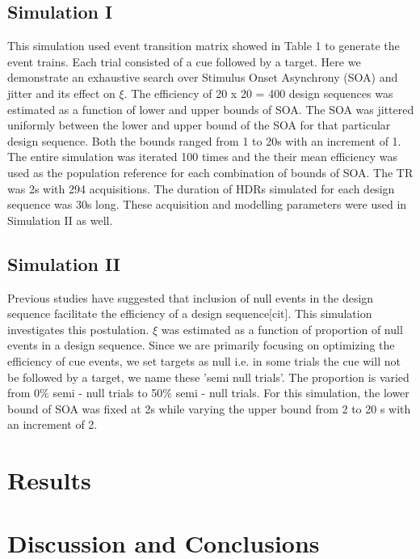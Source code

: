 \documentclass[11pt]{article}
\begin{document}
\subsection{Simulation I}
This simulation used event transition matrix showed in Table 1 to generate the event trains. Each trial consisted of a cue followed by a target. Here we demonstrate an exhaustive search over Stimulus Onset Asynchrony (SOA) and jitter and its effect on $\xi$. The efficiency of 20 x 20 = 400 design sequences was estimated as a function of lower and upper bounds of SOA. The SOA was jittered uniformly between the lower and upper bound of the SOA for that particular design sequence. Both the bounds ranged from 1 to 20s with an increment of 1. The entire simulation was iterated 100 times and the their mean efficiency was used as the population reference for each combination of bounds of SOA. The TR was 2s with 294 acquisitions. The duration of HDRs simulated for each design sequence was 30s long. These acquisition and modelling parameters were used in Simulation II as well.

\subsection{Simulation II}
Previous studies have suggested that inclusion of null events in the design sequence facilitate the efficiency of a design sequence[cit]. This simulation investigates this postulation. $\xi$ was estimated as a function of proportion of null events in a design sequence. Since we are primarily focusing on optimizing the efficiency of cue events, we set targets as null i.e. in some trials the cue will not be followed by a target, we name these 'semi null trials'. The proportion is varied from 0\%  semi - null trials to 50\% semi - null trials. For this simulation, the lower bound of SOA was fixed at 2s while varying the upper bound from 2 to 20 s with an increment of 2.

\section{Results}



\section{Discussion and Conclusions}


\medskip

 
\end{document}
